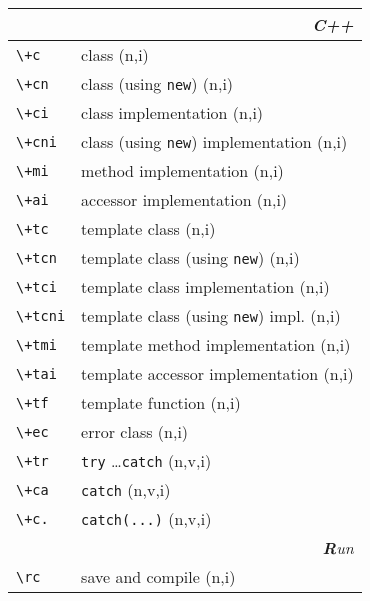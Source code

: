 \documentclass[oneside,10pt,a4paper,DIV24]{scrartcl}
\begin{document}
\begin{center}
\begin{tabular}[]{|p{14mm}|p{58mm}|}
\hline
\hline 
\multicolumn{2}{|r|}{\textsl{C\textbf{+}+}} \\
\hline \verb'\+c'  & class                                    \hfill (n,i)\\
\hline \verb'\+cn' & class (using \verb'new')                 \hfill (n,i)\\
\hline 
\hline \verb'\+ci'  & class  implementation             			\hfill (n,i)\\
\hline \verb'\+cni' & class (using \verb'new') implementation \hfill (n,i)\\
\hline \verb'\+mi'  & method implementation             			\hfill (n,i)\\
\hline \verb'\+ai'  & accessor implementation            			\hfill (n,i)\\
\hline 
\hline \verb'\+tc' & template class                           \hfill (n,i)\\
\hline \verb'\+tcn'& template class (using \verb'new')        \hfill (n,i)\\
\hline 
\hline \verb'\+tci' & template class  implementation          \hfill (n,i)\\
\hline \verb'\+tcni'& template class (using \verb'new') impl. \hfill (n,i)\\
\hline \verb'\+tmi' & template method implementation          \hfill (n,i)\\
\hline \verb'\+tai' & template accessor implementation        \hfill (n,i)\\
\hline 
\hline \verb'\+tf' & template function                        \hfill (n,i)\\
\hline \verb'\+ec' & error class                              \hfill (n,i)\\
\hline \verb'\+tr' & \verb'try' \dots \verb'catch'            \hfill (n,v,i)\\
\hline \verb'\+ca' & \verb'catch'                             \hfill (n,v,i)\\
\hline \verb'\+c.' & \verb'catch(...)'                        \hfill (n,v,i)\\
\hline 
\hline
\multicolumn{2}{|r|}{\textsl{\textbf{R}un}} \\
\hline \verb'\rc'  & save and compile                        \hfill (n,i)\\

\end{tabular}
\end{center}
\end{document}
